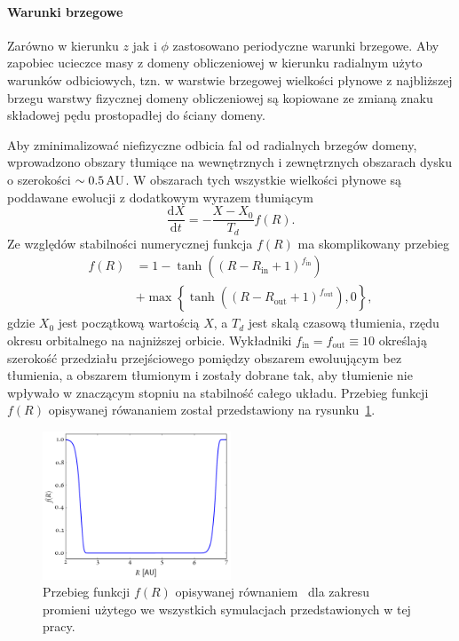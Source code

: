\paragraph{Warunki brzegowe}
Zarówno w kierunku $z$ jak i $\phi$ zastosowano periodyczne warunki brzegowe.
Aby zapobiec ucieczce masy z domeny obliczeniowej w kierunku radialnym użyto
warunków odbiciowych, tzn. w warstwie brzegowej wielkości płynowe z najbliższej
brzegu warstwy fizycznej domeny obliczeniowej są kopiowane ze zmianą znaku
składowej pędu prostopadłej do ściany domeny.

\par Aby zminimalizować niefizyczne odbicia fal od radialnych brzegów domeny,
wprowadzono obszary tłumiące na wewnętrznych i zewnętrznych obszarach dysku o
szerokości $\sim0.5\hbox{$\thinspace\textrm{AU}$}$. W obszarach tych wszystkie wielkości płynowe są
poddawane ewolucji z dodatkowym wyrazem tłumiącym
\begin{equation}
  \frac{\textrm{d}X}{\textrm{d}t} = - \frac{X-X_0}{T_d}f(R).
\end{equation}
Ze względów stabilności numerycznej funkcja $f(R)$ ma skomplikowany przebieg
\begin{equation}\label{eq:overlap}
   \begin{split} 
      f(R) &= 1 - \tanh\left(\left(R - R_\textrm{in} + 1
      \right)^{f_\textrm{in}}\right)\\ &+ \max\left\{ \tanh\left(\left(R -
      R_\textrm{out} + 1\right)^{f_\textrm{out}}\right), 0\right\}, 
   \end{split}
\end{equation}
gdzie $X_0$ jest początkową wartością $X$, a $T_d$ jest skalą czasową tłumienia,
rzędu okresu orbitalnego na najniższej orbicie.
Wykładniki $f_\textrm{in}=f_\textrm{out}\equiv10$ określają szerokość przedziału
przejściowego pomiędzy obszarem ewoluującym bez tłumienia, a obszarem tłumionym
i zostały dobrane tak, aby tłumienie nie wpływało w znaczącym stopniu na
stabilność całego układu. Przebieg funkcji $f(R)$ opisywanej rówananiem
 został przedstawiony na rysunku~\ref{fig:overlap}.
%
\begin{figure}
   \centering
   \includegraphics[width=0.5\textwidth]{figures/overlap}
   \caption{Przebieg funkcji $f(R)$ opisywanej równaniem~ dla
   zakresu promieni użytego we wszystkich symulacjach przedstawionych w tej
pracy.}
   \label{fig:overlap}
\end{figure}
%
